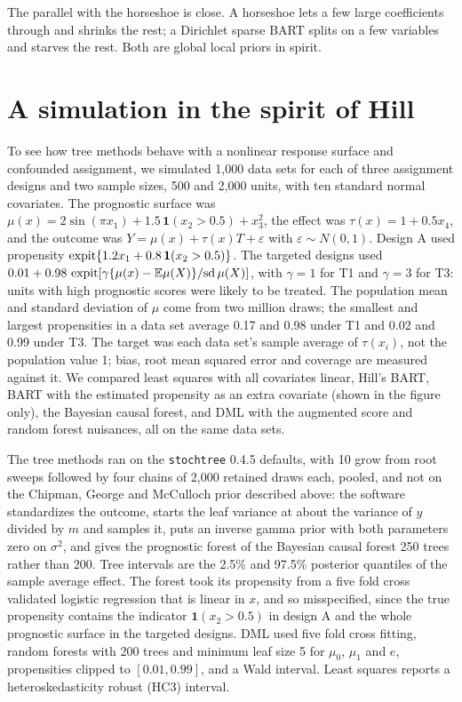 The parallel with the horseshoe is close. A horseshoe lets a few large coefficients through and shrinks the rest; a Dirichlet sparse BART splits on a few variables and starves the rest. Both are global local priors in spirit.

\section{A simulation in the spirit of Hill}

To see how tree methods behave with a nonlinear response surface and confounded assignment, we simulated 1,000 data sets for each of three assignment designs and two sample sizes, 500 and 2,000 units, with ten standard normal covariates. The prognostic surface was $\mu(x) = 2\sin(\pi x_1) + 1.5\,\mathbf{1}(x_2 > 0.5) + x_3^2$, the effect was $\tau(x) = 1 + 0.5x_4$, and the outcome was $Y = \mu(x) + \tau(x)T + \varepsilon$ with $\varepsilon \sim N(0, 1)$. Design A used propensity $\operatorname{expit}\{1.2x_1 + 0.8\,\mathbf{1}(x_2 > 0.5)\}$. The targeted designs used $0.01 + 0.98\,\operatorname{expit}[\gamma\{\mu(x) - \mathbb{E}\mu(X)\}/\mathrm{sd}\,\mu(X)]$, with $\gamma = 1$ for T1 and $\gamma = 3$ for T3: units with high prognostic scores were likely to be treated. The population mean and standard deviation of $\mu$ come from two million draws; the smallest and largest propensities in a data set average 0.17 and 0.98 under T1 and 0.02 and 0.99 under T3. The target was each data set's sample average of $\tau(x_i)$, not the population value 1; bias, root mean squared error and coverage are measured against it. We compared least squares with all covariates linear, Hill's BART, BART with the estimated propensity as an extra covariate (shown in the figure only), the Bayesian causal forest, and DML with the augmented score and random forest nuisances, all on the same data sets.

The tree methods ran on the \texttt{stochtree} 0.4.5 defaults, with 10 grow from root sweeps followed by four chains of 2,000 retained draws each, pooled, and not on the Chipman, George and McCulloch prior described above: the software standardizes the outcome, starts the leaf variance at about the variance of $y$ divided by $m$ and samples it, puts an inverse gamma prior with both parameters zero on $\sigma^2$, and gives the prognostic forest of the Bayesian causal forest 250 trees rather than 200. Tree intervals are the 2.5\% and 97.5\% posterior quantiles of the sample average effect. The forest took its propensity from a five fold cross validated logistic regression that is linear in $x$, and so misspecified, since the true propensity contains the indicator $\mathbf{1}(x_2 > 0.5)$ in design A and the whole prognostic surface in the targeted designs. DML used five fold cross fitting, random forests with 200 trees and minimum leaf size 5 for $\mu_0$, $\mu_1$ and $e$, propensities clipped to $[0.01, 0.99]$, and a Wald interval. Least squares reports a heteroskedasticity robust (HC3) interval.

